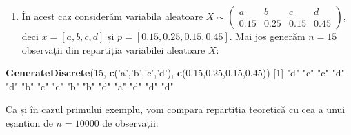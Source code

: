 \documentclass[]{article}
\newenvironment{Shaded}{\begin{snugshade}}{\end{snugshade}}
\newcommand{\KeywordTok}[1]{\textcolor[rgb]{0.13,0.29,0.53}{\textbf{#1}}}
\newcommand{\DecValTok}[1]{\textcolor[rgb]{0.00,0.00,0.81}{#1}}
\newcommand{\FloatTok}[1]{\textcolor[rgb]{0.00,0.00,0.81}{#1}}
\newcommand{\StringTok}[1]{\textcolor[rgb]{0.31,0.60,0.02}{#1}}
\newcommand{\NormalTok}[1]{#1}
\providecommand{\tightlist}{%
  \setlength{\itemsep}{0pt}\setlength{\parskip}{0pt}}
\begin{document}
\begin{enumerate}
\def\labelenumi{\arabic{enumi}.}
\setcounter{enumi}{1}
\tightlist
\item
  În acest caz considerăm variabila aleatoare
  \(X\sim\begin{pmatrix}a & b & c & d\\ 0.15 & 0.25 & 0.15 & 0.45\end{pmatrix}\),
  deci \(x=[a,b,c,d]\) și \(p=[0.15,0.25,0.15,0.45]\). Mai jos generăm
  \(n = 15\) observații din repartiția variabilei aleatoare \(X\):
\end{enumerate}

\begin{Shaded}
\begin{Highlighting}[]
\KeywordTok{GenerateDiscrete}\NormalTok{(}\DecValTok{15}\NormalTok{, }\KeywordTok{c}\NormalTok{(}\StringTok{'a'}\NormalTok{,}\StringTok{'b'}\NormalTok{,}\StringTok{'c'}\NormalTok{,}\StringTok{'d'}\NormalTok{), }\KeywordTok{c}\NormalTok{(}\FloatTok{0.15}\NormalTok{,}\FloatTok{0.25}\NormalTok{,}\FloatTok{0.15}\NormalTok{,}\FloatTok{0.45}\NormalTok{))}
\NormalTok{ [}\DecValTok{1}\NormalTok{] }\StringTok{"d"} \StringTok{"c"} \StringTok{"c"} \StringTok{"d"} \StringTok{"d"} \StringTok{"b"} \StringTok{"c"} \StringTok{"c"} \StringTok{"b"} \StringTok{"b"} \StringTok{"d"} \StringTok{"a"} \StringTok{"d"} \StringTok{"d"} \StringTok{"d"}
\end{Highlighting}
\end{Shaded}

Ca și în cazul primului exemplu, vom compara repartiția teoretică cu cea
a unui eșantion de \(n = 10000\) de observații:
\end{document}
